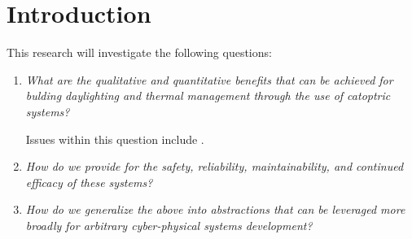 \section{Introduction}
\label{sec:intro}




This research will investigate the following questions:
\begin{enumerate}

\item \emph{What are the qualitative and quantitative benefits
that can be achieved for bulding daylighting and thermal management
through the use of catoptric systems?}

Issues within this question include .

\item \emph{How do we provide for the safety, reliability, maintainability, and
continued efficacy of these systems?}

\item \emph{How do we generalize the above into abstractions that can be
leveraged more broadly for arbitrary cyber-physical systems development?}

\end{enumerate}

